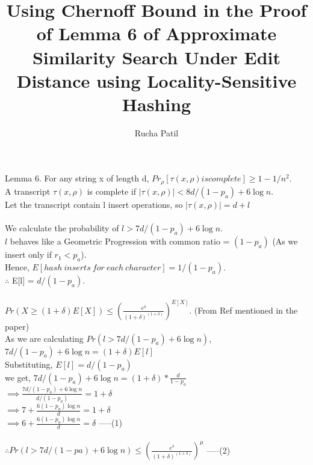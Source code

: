 \documentclass{article}
\title{Using Chernoff Bound in the Proof of Lemma 6 of Approximate Similarity Search Under Edit Distance using Locality-Sensitive Hashing}
\author{Rucha Patil}
\date{}
\begin{document}
\maketitle
Lemma 6. For any string x of length d, 
$Pr_\rho [\tau(x,\rho) is complete] \geq 1-1/n^2$.\\

A transcript $\tau(x,\rho)$ is complete if 
$|\tau(x,\rho)| < 8d/(1-p_a)+6\log n$. \\
Let the transcript contain l insert operations, so $|\tau(x,\rho)| = d+l$\\
\\
We calculate the probability of $l>7d/(1-p_a)+6\log n$. \\
$l$ behaves like a Geometric Progression with common ratio = $(1-p_a)$ (As we insert only if $r_1<p_a$).\\
Hence, 
$E[hash\ inserts\ for\ each\ character] = 1/(1-p_a)$.\\
$\therefore$ E[l] = $d/(1-p_a)$.\\
\\
$Pr(X\geq(1+\delta)E[X]) \leq (\frac{e^\delta}{(1+\delta)^{(1+\delta)}})^{E[X]}$. (From Ref mentioned in the paper)\\
As we are calculating $Pr(l>7d/(1-p_a)+6\log n)$,
$7d/(1-p_a)+6\log n = (1+\delta)E[l]$\\
Substituting, $E[l] = d/(1-p_a)$\\
we get, $7d/(1-p_a)+6\log n = (1+\delta)*\frac{d}{1-p_a}$ \\
$\implies \frac{7d/(1-p_a)+6\log n}{d/(1-p_a)} = 1+\delta$ \\
$\implies 7 + \frac{6(1-p_a)\log n}{d} = 1+\delta$ \\
$\implies 6 + \frac{6(1-p_a)\log n}{d} = \delta$ -----(1) \\
\\
$\therefore Pr(l>7d/(1-pa)+6\log n) \leq (\frac{e^\delta}{(1+\delta)^(1+\delta)})^\mu$ -----(2) \\
\\
\end{document}
